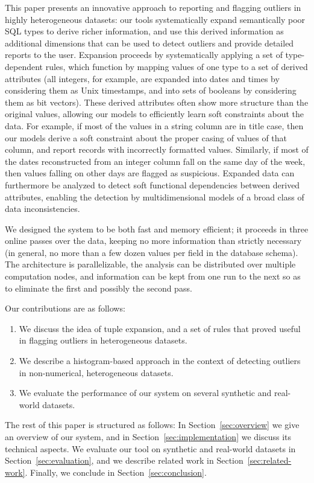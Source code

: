 This paper presents an innovative approach to reporting and flagging outliers in highly heterogeneous datasets: our tools systematically expand semantically poor SQL types to derive richer information, and use this derived information as additional dimensions that can be used to detect outliers and provide detailed reports to the user. Expansion proceeds by systematically applying a set of type-dependent rules, which function by mapping values of one type to a set of derived attributes (all integers, for example, are expanded into dates and times by considering them as Unix timestamps, and into sets of booleans by considering them as bit vectors). These derived attributes often show more structure than the original values, allowing our models to efficiently learn soft constraints about the data. For example, if most of the values in a string column are in title case, then our models derive a soft constraint about the proper casing of values of that column, and report records with incorrectly formatted values. Similarly, if most of the dates reconstructed from an integer column fall on the same day of the week, then values falling on other days are flagged as suspicious. Expanded data can furthermore be analyzed to detect soft functional dependencies between derived attributes, enabling the detection by multidimensional models of a broad class of data inconsistencies.

We designed the system to be both fast and memory efficient; it proceeds in three online passes over the data, keeping no more information than strictly necessary (in general, no more than a few dozen values per field in the database schema). The architecture is parallelizable, the analysis can be distributed over multiple computation nodes, and information can be kept from one run to the next so as to eliminate the first and possibly the second pass.

Our contributions are as follows:
\begin{enumerate}
\item We discuss the idea of tuple expansion, and a set of rules that proved useful in flagging outliers in heterogeneous datasets.
\item We describe a histogram-based approach in the context of detecting outliers in non-numerical, heterogeneous datasets.
\item We evaluate the performance of our system on several synthetic and real-world datasets.
\end{enumerate}

The rest of this paper is structured as follows: In Section~\ref{sec:overview} we give an overview of our system, and in Section~\ref{sec:implementation} we discuss its technical aspects. We evaluate our tool on synthetic and real-world datasets in Section~\ref{sec:evaluation}, and we describe related work in Section~\ref{sec:related-work}. Finally, we conclude in Section~\ref{sec:conclusion}. %
